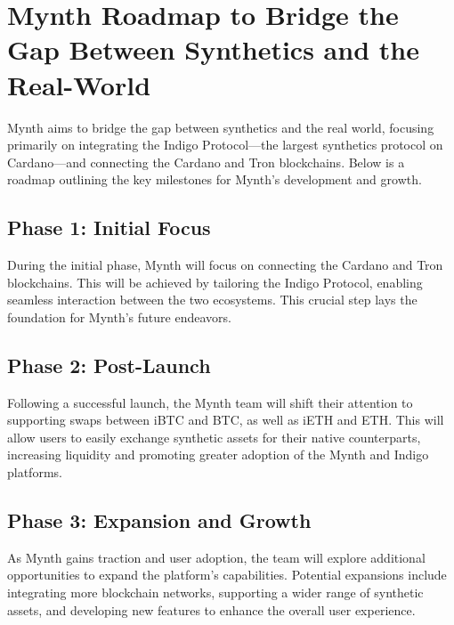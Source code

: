\hypertarget{mynth-roadmap-to-bridge-the-gap-between-synthetics-and-the-real-world}{%
\section{Mynth Roadmap to Bridge the Gap Between Synthetics and the
Real-World}\label{mynth-roadmap-to-bridge-the-gap-between-synthetics-and-the-real-world}}

Mynth aims to bridge the gap between synthetics and the real world,
focusing primarily on integrating the Indigo Protocol---the largest
synthetics protocol on Cardano---and connecting the Cardano and Tron
blockchains. Below is a roadmap outlining the key milestones for Mynth's
development and growth.

\hypertarget{phase-1-initial-focus}{%
\subsection{Phase 1: Initial Focus}\label{phase-1-initial-focus}}

During the initial phase, Mynth will focus on connecting the Cardano and
Tron blockchains. This will be achieved by tailoring the Indigo
Protocol, enabling seamless interaction between the two ecosystems. This
crucial step lays the foundation for Mynth's future endeavors.

\hypertarget{phase-2-post-launch}{%
\subsection{Phase 2: Post-Launch}\label{phase-2-post-launch}}

Following a successful launch, the Mynth team will shift their attention
to supporting swaps between iBTC and BTC, as well as iETH and ETH. This
will allow users to easily exchange synthetic assets for their native
counterparts, increasing liquidity and promoting greater adoption of the
Mynth and Indigo platforms.

\hypertarget{phase-3-expansion-and-growth}{%
\subsection{Phase 3: Expansion and
Growth}\label{phase-3-expansion-and-growth}}

As Mynth gains traction and user adoption, the team will explore
additional opportunities to expand the platform's capabilities.
Potential expansions include integrating more blockchain networks,
supporting a wider range of synthetic assets, and developing new
features to enhance the overall user experience.

